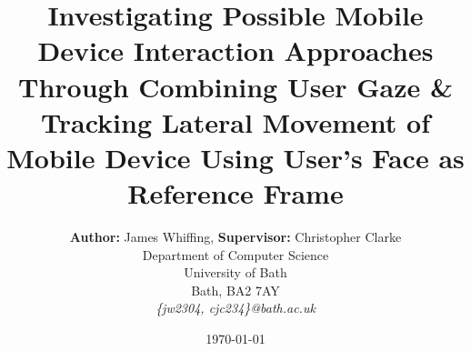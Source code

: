
\thispagestyle{empty} %

\title{Investigating Possible Mobile Device Interaction Approaches Through Combining User Gaze \& Tracking Lateral Movement of Mobile Device Using User's Face as Reference Frame}

\renewcommand\maketitlehookb{\centering \Large CM50175 - Project Proposal}
\date{\today}
\author{
    \textbf{Author:} James Whiffing, \textbf{Supervisor:}  Christopher Clarke\\
    Department of Computer Science\\
    University of Bath\\
    Bath, BA2 7AY \\
    \textit{\{jw2304, cjc234\}@bath.ac.uk}
}

\maketitle

\clearpage
\restoregeometry
\newpage

\setcounter{page}{0}
\pagestyle{fancy}


\tableofcontents
\clearpage
\newpage
{}
\listoffigures
\clearpage
\newpage
{}
\listoftables
\clearpage
\newpage


\setcounter{page}{1}
